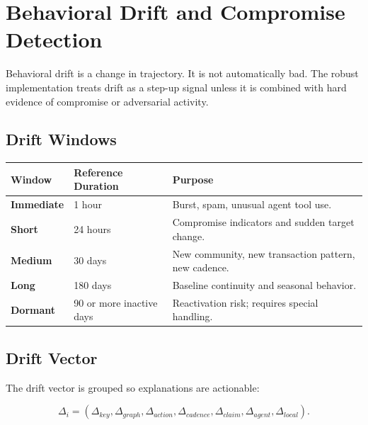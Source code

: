 \documentclass[11pt]{article}
\begin{document}
\section{Behavioral Drift and Compromise Detection}

Behavioral drift is a change in trajectory. It is not automatically bad. The robust implementation treats drift as a step-up signal unless it is combined with hard evidence of compromise or adversarial activity.

\subsection{Drift Windows}

\begin{center}
\begin{tabularx}{\textwidth}{>{\bfseries}p{} p{} X}
\toprule
Window & Reference Duration & Purpose \\
\midrule
Immediate & 1 hour & Burst, spam, unusual agent tool use. \\
Short & 24 hours & Compromise indicators and sudden target change. \\
Medium & 30 days & New community, new transaction pattern, new cadence. \\
Long & 180 days & Baseline continuity and seasonal behavior. \\
Dormant & 90 or more inactive days & Reactivation risk; requires special handling. \\
\bottomrule
\end{tabularx}
\end{center}

\subsection{Drift Vector}

The drift vector is grouped so explanations are actionable:

\begin{equation}
\Delta_i=(\Delta_{key},\Delta_{graph},\Delta_{action},\Delta_{cadence},\Delta_{claim},\Delta_{agent},\Delta_{local}).
\end{equation}
\end{document}
